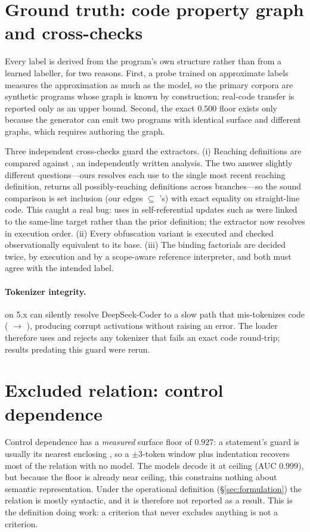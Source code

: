 \section{Ground truth: code property graph and cross-checks}
\label{app:groundtruth}
Every label is derived from the program's own structure rather than from a
learned labeller, for two reasons. First, a probe trained on approximate labels
measures the approximation as much as the model, so the primary corpora are
synthetic programs whose graph is known by construction; real-code transfer is
reported only as an upper bound. Second, the exact $0.500$ floor exists only
because the generator can emit two programs with identical surface and different
graphs, which requires authoring the graph.

Three independent cross-checks guard the extractors. (i) Reaching definitions are
compared against , an independently written analysis. The two answer
slightly different questions---ours resolves each use to the single most recent
reaching definition,  returns all possibly-reaching definitions
across branches---so the sound comparison is set inclusion (our edges $\subseteq$
's) with exact equality on straight-line code. This caught a real
bug: uses in self-referential updates such as  were linked to the
same-line target rather than the prior definition; the extractor now resolves in
execution order. (ii) Every obfuscation variant is executed and checked
observationally equivalent to its base. (iii) The binding factorials are decided
twice, by execution and by a scope-aware reference interpreter, and both must
agree with the intended label.

\paragraph{Tokenizer integrity.}  on  5.x
can silently resolve DeepSeek-Coder to a slow path that mis-tokenizes code
( $\to$ \code{['de','ff','unc']}), producing corrupt activations
without raising an error. The loader therefore uses 
and rejects any tokenizer that fails an exact code round-trip; results predating
this guard were rerun.

\section{Excluded relation: control dependence}
\label{app:controldep}
Control dependence has a \emph{measured} surface floor of $0.927$: a statement's
guard is usually its nearest enclosing , so a $\pm 3$-token window plus
indentation recovers most of the relation with no model. The models decode it at
ceiling (AUC $0.999$), but because the floor is already near ceiling, this
constrains nothing about semantic representation. Under the operational definition
(\S\ref{sec:formulation}) the relation is mostly syntactic, and it is therefore
not reported as a result. This is the definition doing work: a criterion that
never excludes anything is not a criterion.


